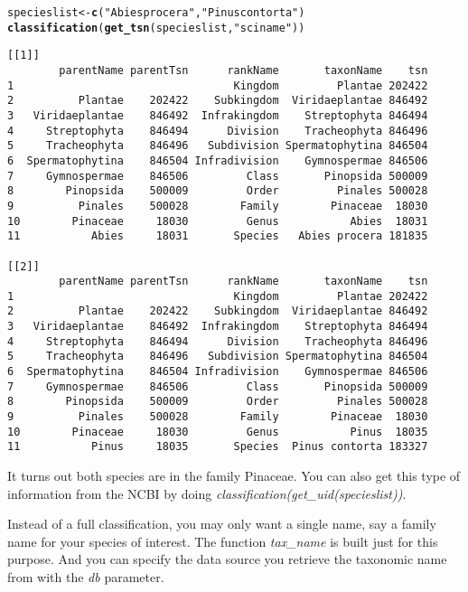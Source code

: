 \documentclass[10pt]{article}\usepackage{graphicx, color}
\makeatletter
\newcommand{\hlfunctioncall}[1]{\textcolor[rgb]{0.501960784313725,0,0.329411764705882}{\textbf{#1}}}%
\newcommand{\hlstring}[1]{\textcolor[rgb]{0.6,0.6,1}{#1}}%
\newenvironment{kframe}{%
 \def\at@end@of@kframe{}%
 \ifinner\ifhmode%
  \def\at@end@of@kframe{\end{minipage}}%
  \begin{minipage}{\columnwidth}%
 \fi\fi%
 \def\FrameCommand##1{\hskip\@totalleftmargin \hskip-\fboxsep
 \colorbox{shadecolor}{##1}\hskip-\fboxsep
     \hskip-\linewidth \hskip-\@totalleftmargin \hskip\columnwidth}%
 \MakeFramed {\advance\hsize-\width
   \@totalleftmargin\z@ \linewidth\hsize
   \@setminipage}}%
 {\par\unskip\endMakeFramed%
 \at@end@of@kframe}
\newenvironment{knitrout}{}{} %
\makeatother
\begin{document}
\begin{knitrout}
\color{fgcolor}\begin{kframe}
\begin{alltt}
specieslist <- \hlfunctioncall{c}(\hlstring{"Abies procera"}, \hlstring{"Pinus contorta"})
\hlfunctioncall{classification}(\hlfunctioncall{get_tsn}(specieslist, \hlstring{"sciname"}))
\end{alltt}
\begin{verbatim}
[[1]]
        parentName parentTsn      rankName       taxonName    tsn
1                                  Kingdom         Plantae 202422
2          Plantae    202422    Subkingdom  Viridaeplantae 846492
3   Viridaeplantae    846492  Infrakingdom    Streptophyta 846494
4     Streptophyta    846494      Division    Tracheophyta 846496
5     Tracheophyta    846496   Subdivision Spermatophytina 846504
6  Spermatophytina    846504 Infradivision    Gymnospermae 846506
7     Gymnospermae    846506         Class       Pinopsida 500009
8        Pinopsida    500009         Order         Pinales 500028
9          Pinales    500028        Family        Pinaceae  18030
10        Pinaceae     18030         Genus           Abies  18031
11           Abies     18031       Species   Abies procera 181835

[[2]]
        parentName parentTsn      rankName       taxonName    tsn
1                                  Kingdom         Plantae 202422
2          Plantae    202422    Subkingdom  Viridaeplantae 846492
3   Viridaeplantae    846492  Infrakingdom    Streptophyta 846494
4     Streptophyta    846494      Division    Tracheophyta 846496
5     Tracheophyta    846496   Subdivision Spermatophytina 846504
6  Spermatophytina    846504 Infradivision    Gymnospermae 846506
7     Gymnospermae    846506         Class       Pinopsida 500009
8        Pinopsida    500009         Order         Pinales 500028
9          Pinales    500028        Family        Pinaceae  18030
10        Pinaceae     18030         Genus           Pinus  18035
11           Pinus     18035       Species  Pinus contorta 183327
\end{verbatim}
\end{kframe}
\end{knitrout}


It turns out both species are in the family Pinaceae. You can also get this type of information from the NCBI by doing \emph{classification(get\_uid(specieslist))}.

Instead of a full classification, you may only want a single name, say a family name for your species of interest. The function \emph{tax\_name} is built just for this purpose. And you can specify the data source you retrieve the taxonomic name from with the \emph{db} parameter. 
\end{document}

